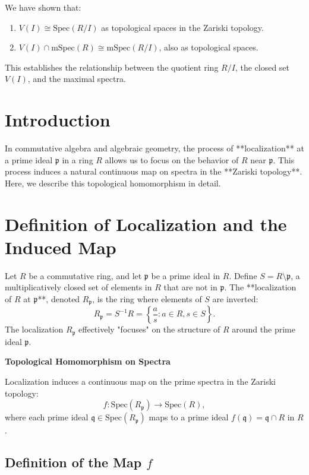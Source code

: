 \documentclass[11pt,openany]{article}
\begin{document}
We have shown that:
\begin{enumerate}
	\item \( V(I) \cong \text{Spec}(R/I) \) as topological spaces in the Zariski topology.
	\item \( V(I) \cap \text{mSpec}(R) \cong \text{mSpec}(R/I) \), also as topological spaces.
\end{enumerate}

This establishes the relationship between the quotient ring \( R/I \), the closed set \( V(I) \), and the maximal spectra.

\newpage
\section*{Introduction}

In commutative algebra and algebraic geometry, the process of **localization** at a prime ideal \( \mathfrak{p} \) in a ring \( R \) allows us to focus on the behavior of \( R \) near \( \mathfrak{p} \). This process induces a natural continuous map on spectra in the **Zariski topology**. Here, we describe this topological homomorphism in detail.

\section*{Definition of Localization and the Induced Map}

Let \( R \) be a commutative ring, and let \( \mathfrak{p} \) be a prime ideal in \( R \). Define \( S = R \setminus \mathfrak{p} \), a multiplicatively closed set of elements in \( R \) that are not in \( \mathfrak{p} \). The **localization of \( R \) at \( \mathfrak{p} \)**, denoted \( R_{\mathfrak{p}} \), is the ring where elements of \( S \) are inverted:
\[
R_{\mathfrak{p}} = S^{-1} R = \left\{ \frac{a}{s} : a \in R, s \in S \right\}.
\]
The localization \( R_{\mathfrak{p}} \) effectively "focuses" on the structure of \( R \) around the prime ideal \( \mathfrak{p} \).

\textbf{Topological Homomorphism on Spectra}

Localization induces a continuous map on the prime spectra in the Zariski topology:
\[
f: \text{Spec}(R_{\mathfrak{p}}) \to \text{Spec}(R),
\]
where each prime ideal \( \mathfrak{q} \in \text{Spec}(R_{\mathfrak{p}}) \) maps to a prime ideal \( f(\mathfrak{q}) = \mathfrak{q} \cap R \) in \( R \).

\subsection*{Definition of the Map \( f \)}
\end{document}
